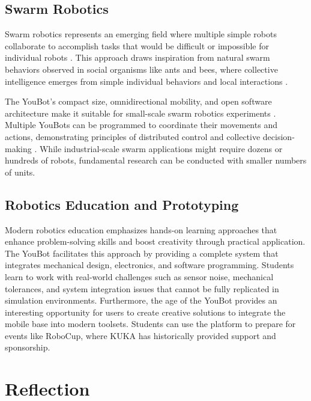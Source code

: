 \documentclass[a4paper, 12pt]{article}
\begin{document}
   

    \subsection{Swarm Robotics}

    Swarm robotics represents an emerging field where multiple simple robots collaborate to accomplish tasks that would be difficult or impossible for individual robots \cite{swarmbot_hardware} \cite{upm_swarm}. This approach draws inspiration from natural swarm behaviors observed in social organisms like ants and bees, where collective intelligence emerges from simple individual behaviors and local interactions \cite{swarmbot_hardware} \cite{azorobotics_swarm}.

    The YouBot's compact size, omnidirectional mobility, and open software architecture make it suitable for small-scale swarm robotics experiments \cite{swarmbot_hardware}. Multiple YouBots can be programmed to coordinate their movements and actions, demonstrating principles of distributed control and collective decision-making \cite{swarmbot_hardware}\cite{azorobotics_swarm}. While industrial-scale swarm applications might require dozens or hundreds of robots, fundamental research can be conducted with smaller numbers of units. 

    \subsection{Robotics Education and Prototyping}

    Modern robotics education emphasizes hands-on learning approaches that enhance problem-solving skills and boost creativity through practical application. The YouBot facilitates this approach by providing a complete system that integrates mechanical design, electronics, and software programming. Students learn to work with real-world challenges such as sensor noise, mechanical tolerances, and system integration issues that cannot be fully replicated in simulation environments. Furthermore, the age of the YouBot provides an interesting opportunity for users to create creative solutions to integrate the mobile base into modern toolsets. Students can use the platform to prepare for events like RoboCup, where KUKA has historically provided support and sponsorship.


    \pagebreak

    
    \section{Reflection}
\end{document}

